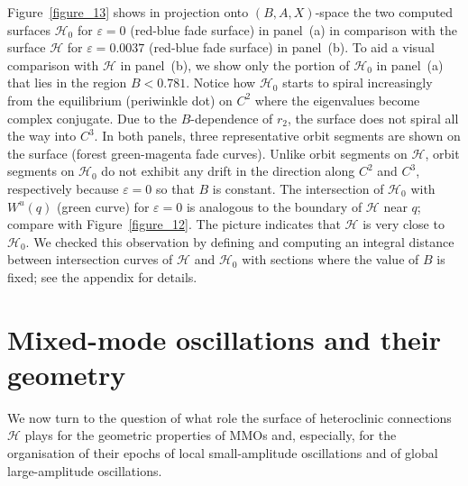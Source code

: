 \documentclass{ws-ijbc}
\begin{document}
Figure~\ref{figure_13} shows in projection onto $(B,A,X)$-space the two computed surfaces $\mathscr{H}_0$ for $\varepsilon=0$ (red-blue fade surface) in panel~(a) in comparison with the surface $\mathscr{H}$ for $\varepsilon=0.0037$ (red-blue fade surface) in panel~(b).  To aid a visual comparison with $\mathscr{H}$ in panel~(b), we show only the portion of $\mathscr{H}_0$ in panel~(a) that lies in the region $B < 0.781$.  Notice how $\mathscr{H}_0$ starts to spiral increasingly from the equilibrium (periwinkle dot) on $C^2$ where the eigenvalues become complex conjugate.  Due to the $B$-dependence of $r_2$, the surface does not spiral all the way into $C^3$.  In both panels, three representative orbit segments are shown on the surface (forest green-magenta fade curves).  Unlike orbit segments on $\mathscr{H}$, orbit segments on $\mathscr{H}_0$ do not exhibit any drift in the direction along $C^2$ and $C^3$, respectively because $\varepsilon=0$ so that $B$ is constant.  The intersection of $\mathscr{H}_0$ with $W^u(q)$ (green curve) for $\varepsilon=0$ is analogous to the boundary of $\mathscr{H}$ near $q$; compare with Figure~\ref{figure_12}.  The picture indicates that $\mathscr{H}$ is very close to $\mathscr{H}_0$.  We checked this observation by defining and computing an integral distance between intersection curves of $\mathscr{H}$ and $\mathscr{H}_0$ with sections where the value of $B$ is fixed; see the appendix for details.


\section{Mixed-mode oscillations and their geometry}
\label{sec:mmogeom}

We now turn to the question of what role the surface of heteroclinic connections $\mathscr{H}$ plays for the geometric properties of MMOs and, especially, for the organisation of their epochs of local small-amplitude oscillations and of global large-amplitude oscillations.  
\end{document}
